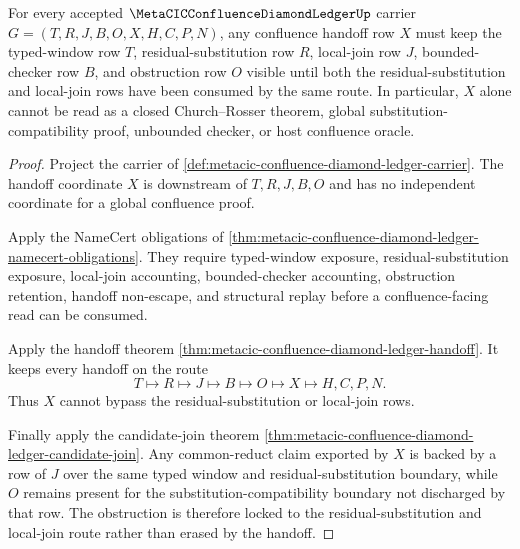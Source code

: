 \begin{theorem}
\label{thm:metacic-confluence-diamond-ledger-obstruction-lock}
For every accepted $\MetaCICConfluenceDiamondLedgerUp$ carrier $G=(T,R,J,B,O,X,H,C,P,N)$, any confluence handoff row $X$ must keep the typed-window row $T$, residual-substitution row $R$, local-join row $J$, bounded-checker row $B$, and obstruction row $O$ visible until both the residual-substitution and local-join rows have been consumed by the same route. In particular, $X$ alone cannot be read as a closed Church--Rosser theorem, global substitution-compatibility proof, unbounded checker, or host confluence oracle.
\end{theorem}
\begin{proof}
Project the carrier of \autoref{def:metacic-confluence-diamond-ledger-carrier}. The handoff coordinate $X$ is downstream of $T,R,J,B,O$ and has no independent coordinate for a global confluence proof.

Apply the NameCert obligations of \autoref{thm:metacic-confluence-diamond-ledger-namecert-obligations}. They require typed-window exposure, residual-substitution exposure, local-join accounting, bounded-checker accounting, obstruction retention, handoff non-escape, and structural replay before a confluence-facing read can be consumed.

Apply the handoff theorem \autoref{thm:metacic-confluence-diamond-ledger-handoff}. It keeps every handoff on the route
$$
T \longmapsto R \longmapsto J \longmapsto B \longmapsto O \longmapsto X \longmapsto H,C,P,N .
$$
Thus $X$ cannot bypass the residual-substitution or local-join rows.

Finally apply the candidate-join theorem \autoref{thm:metacic-confluence-diamond-ledger-candidate-join}. Any common-reduct claim exported by $X$ is backed by a row of $J$ over the same typed window and residual-substitution boundary, while $O$ remains present for the substitution-compatibility boundary not discharged by that row. The obstruction is therefore locked to the residual-substitution and local-join route rather than erased by the handoff.
\end{proof}



